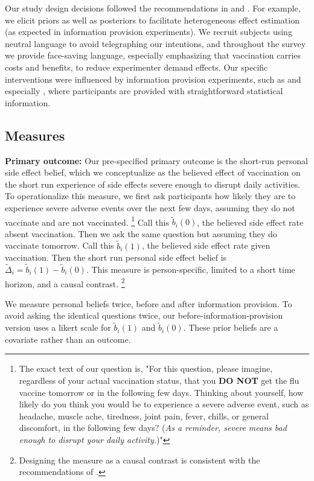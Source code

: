 Our study design decisions followed the recommendations in \citet{haaland2023designing}
and \citet{stantcheva2023run}. For example, we elicit priors as well as posteriors to facilitate 
heterogeneous effect estimation (as expected in information provision experiments).
We recruit subjects using neutral language to avoid telegraphing our intentions, and
throughout the survey we provide face-saving language, especially emphasizing
that vaccination carries costs and benefits, to reduce experimenter demand effects.
Our specific interventions were influenced by information provision experiments, 
such as \citet{chopra2025home} and especially \citet{roth2024misperceived}, 
where participants are provided with straightforward statistical information. 

\subsection{Measures}

\textbf{Primary outcome:} Our pre-specified primary outcome is the short-run personal 
side effect belief, which we conceptualize as 
the believed effect of vaccination on the short run experience of side effects severe enough 
to disrupt daily activities. To operationalize this measure, we first ask 
participants how likely they are to experience severe adverse events over 
the next few days, assuming they do not vaccinate and are not vaccinated.%
\footnote{The exact text of our question is, 
"For this question, please imagine, regardless of your actual vaccination status, 
that you \textbf{DO NOT} get the flu vaccine tomorrow or in the following few days.
Thinking about yourself, how likely do you think you would be to experience a severe 
adverse event, such as headache, muscle ache, tiredness, joint pain, fever, chills, or 
general discomfort, in the following few days? 
(\textit{As a reminder, severe means bad enough to disrupt your daily activity.})"
}
Call this
$\tilde{b}_i(0)$, the believed side effect rate absent vaccination.  Then we ask the 
same question but assuming they do vaccinate tomorrow. Call this $\tilde{b}_i(1)$, 
the believed side effect rate given vaccination.  Then the short run personal side effect 
belief is $\tilde{\Delta}_i = \tilde{b}_i(1) - \tilde{b}_i(0)$. 
This measure is person-specific, limited to a short time horizon, and a causal contrast.%
\footnote{Designing the measure as a causal contrast is consistent with the recommendations
of \citet{smith2021participants}.}

We measure personal beliefs twice, before and after information provision. To avoid asking 
the identical questions twice, our before-information-provision version uses a 
likert scale for $\tilde{b}_i(1)$ and $\tilde{b}_i(0)$. These prior beliefs are a covariate 
rather than an outcome. 

